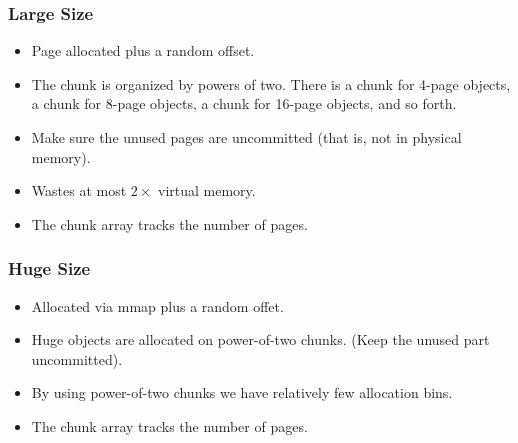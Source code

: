 \documentclass[xcolor=dvipsnames,14pt]{beamer}
\newcommand{\punt}[1]{}
\newcommand{\smmpunt}[1]{#1}
\begin{document}
\punt{
\begin{frame}
\frametitle{Folios}

\begin{itemize}
\item Prime-sized objects leave unused space at the end of a page.

\item Consider the 832-byte bin (13 cache lines). 

\item Four of those objects fit in a page.
\item Wastes 768 bytes at the end.
\item Use somewhat larger pages, we call ``folios'' which contain 64 objects.
\item No fragmentation at the end of the folio.
\item There are a few pages at the end that are unused, but we keep those pages uncommitted.
\end{itemize}
\end{frame}
}

\smmpunt{}
\begin{frame}[fragile]
\frametitle{Large Size}
\begin{itemize}
\item Page allocated plus a random offset.   
\item The chunk is organized by powers of two.  There is a chunk for 4-page objects, a chunk for 8-page objects, a chunk for 16-page objects, and so forth.
\item Make sure the unused pages are uncommitted (that is, not in physical memory).
\item Wastes at most $2\times$ virtual memory.
\item The chunk array tracks the number of pages.
\end{itemize}
\end{frame}
{}

\smmpunt{}
\begin{frame}[fragile]
\frametitle{Huge Size}

\begin{itemize}
\item Allocated via mmap plus a random offet. 
\item Huge objects are allocated on power-of-two chunks.  (Keep the unused part uncommitted).
\item By using power-of-two chunks we have relatively few allocation bins.
\item The chunk array tracks the number of pages.
\end{itemize}
\end{frame}
{}
\end{document}
